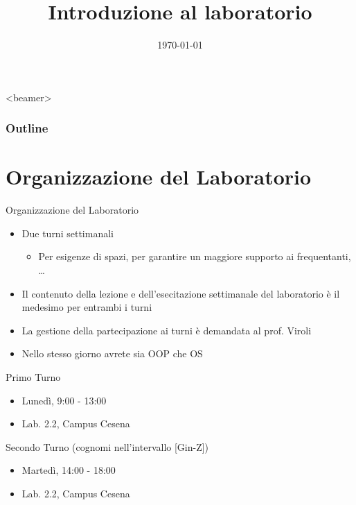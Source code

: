 \documentclass[presentation]{beamer}
\title[{\lab} -- Introduzione]{Introduzione al laboratorio}
\date[\today]{\today}
\begin{document}
\frame[label=coverpage]{\titlepage}

\begin{frame}<beamer>
	\frametitle{Outline}
	\tableofcontents[]
\end{frame}

\section{Organizzazione del Laboratorio}\label{sec:organizzazione-del-laboratorio}

\begin{frame}{Organizzazione del Laboratorio}
    \begin{itemize}
        \item Due turni settimanali
        \begin{itemize}
            \item Per esigenze di spazi, per garantire un maggiore supporto ai frequentanti, \dots
        \end{itemize}
        \item Il contenuto della lezione e dell'esecitazione settimanale del laboratorio è il medesimo per entrambi i turni
        \item La gestione della partecipazione ai turni è demandata al prof. Viroli
        \item Nello stesso giorno avrete sia OOP che OS
    \end{itemize}
    \begin{block}{Primo Turno}
        \begin{itemize}
            \item Lunedì, 9:00 - 13:00
            \item Lab. 2.2, Campus Cesena
        \end{itemize}
    \end{block}
    \begin{block}{Secondo Turno (cognomi nell'intervallo [Gin-Z])}
        \begin{itemize}
            \item Martedì, 14:00 - 18:00
            \item Lab. 2.2, Campus Cesena
        \end{itemize}
    \end{block}
\end{frame}
\end{document}
